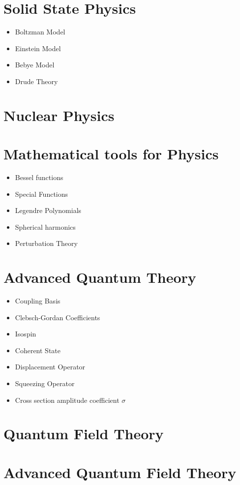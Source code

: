 \documentclass[10pt]{article}
\begin{document}
\section{Solid State Physics}
\begin{itemize}
	\item Boltzman Model
	\item Einstein Model
	\item Bebye Model
	\item Drude Theory
\end{itemize}
\section{Nuclear Physics}
\section{Mathematical tools for Physics}
\begin{itemize}
	\item Bessel functions
	\item Special Functions
	\item Legendre Polynomials
	\item Spherical harmonics
	\item Perturbation Theory
\end{itemize}
\section{Advanced Quantum Theory}
\begin{itemize}
	\item Coupling Basis
	\item Clebsch-Gordan Coefficients
	\item Isospin
	\item Coherent State
	\item Displacement Operator
	\item Squeezing Operator
	\item Cross section amplitude coefficient $\sigma$
\end{itemize}
\section{Quantum Field Theory}
\section{Advanced Quantum Field Theory}
\end{document}
